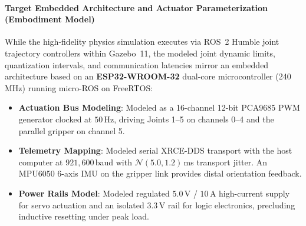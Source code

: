 \documentclass[journal]{IEEEtran}
\begin{document}
\begin{table}[!t]
\centering
\caption{Electromechanical Specifications of the Modeled 5-DoF Manipulator (Simulation; Embodiment Parameters Used for Simulation Parameterization)}
\label{table_hardware_specs}
\footnotesize
{}
\end{table}

\paragraph{Target Embedded Architecture and Actuator Parameterization (Embodiment Model)}
While the high-fidelity physics simulation executes via ROS~2 Humble joint trajectory controllers within Gazebo~11, the modeled joint dynamic limits, quantization intervals, and communication latencies mirror an embedded architecture based on an \textbf{ESP32-WROOM-32} dual-core microcontroller (240\,MHz) running micro-ROS on FreeRTOS:
\begin{itemize}
    \item \textbf{Actuation Bus Modeling}: Modeled as a 16-channel 12-bit PCA9685 PWM generator clocked at $50$\,Hz, driving Joints 1--5 on channels 0--4 and the parallel gripper on channel 5.
    \item \textbf{Telemetry Mapping}: Modeled serial XRCE-DDS transport with the host computer at $921,600$\,baud with $\mathcal{N}(5.0, 1.2)$\,ms transport jitter. An MPU6050 6-axis IMU on the gripper link provides distal orientation feedback.
    \item \textbf{Power Rails Model}: Modeled regulated $5.0$\,V / $10$\,A high-current supply for servo actuation and an isolated $3.3$\,V rail for logic electronics, precluding inductive resetting under peak load.
\end{itemize}
\end{document}
